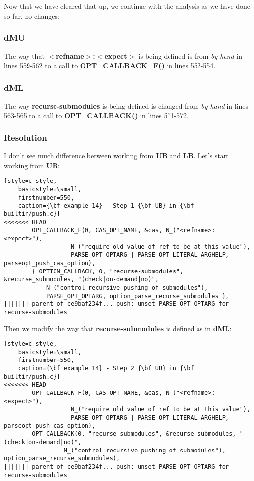 Now that we have cleared that up, we continue with the analysis as we have done so far, no changes:

\subsubsection{dMU}
The way that {\bf $<$refname$>$:$<$expect$>$} is being defined is from {\it by-hand} in lines 559-562 to a call to {\bf OPT\_CALLBACK\_F()}
in lines 552-554.

\subsubsection{dML}
The way {\bf recurse-submodules} is being defined is changed from {\it by hand} in lines 563-565 to a call to {\bf OPT\_CALLBACK()}
in lines 571-572.

\subsubsection{Resolution}
I don't see much difference between working from {\bf UB } and {\bf LB}. Let's start working from {\bf UB}:

\begin{lstlisting}[style=c_style,
	basicstyle=\small,
	firstnumber=550,
	caption={\bf example 14} - Step 1 {\bf UB} in {\bf builtin/push.c}]
<<<<<<< HEAD
		OPT_CALLBACK_F(0, CAS_OPT_NAME, &cas, N_("<refname>:<expect>"),
			       N_("require old value of ref to be at this value"),
			       PARSE_OPT_OPTARG | PARSE_OPT_LITERAL_ARGHELP, parseopt_push_cas_option),
		{ OPTION_CALLBACK, 0, "recurse-submodules", &recurse_submodules, "(check|on-demand|no)",
			N_("control recursive pushing of submodules"),
			PARSE_OPT_OPTARG, option_parse_recurse_submodules },
||||||| parent of ce9baf234f... push: unset PARSE_OPT_OPTARG for --recurse-submodules
\end{lstlisting}

Then we modify the way that {\bf recurse-submodules} is defined as in {\bf dML}:
\begin{lstlisting}[style=c_style,
	basicstyle=\small,
	firstnumber=550,
	caption={\bf example 14} - Step 2 {\bf UB} in {\bf builtin/push.c}]
<<<<<<< HEAD
		OPT_CALLBACK_F(0, CAS_OPT_NAME, &cas, N_("<refname>:<expect>"),
			       N_("require old value of ref to be at this value"),
			       PARSE_OPT_OPTARG | PARSE_OPT_LITERAL_ARGHELP, parseopt_push_cas_option),
		OPT_CALLBACK(0, "recurse-submodules", &recurse_submodules, "(check|on-demand|no)",
			     N_("control recursive pushing of submodules"), option_parse_recurse_submodules),
||||||| parent of ce9baf234f... push: unset PARSE_OPT_OPTARG for --recurse-submodules
\end{lstlisting}

